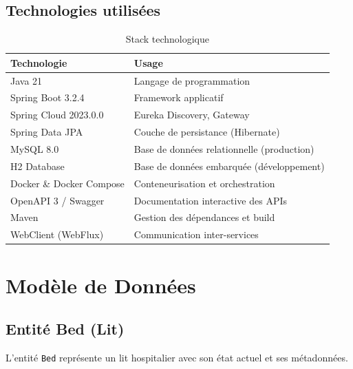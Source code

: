 \documentclass[12pt,a4paper]{report}
\begin{document}
\section{Technologies utilis\'ees}

\begin{table}[H]
    \centering
    \begin{tabularx}{\textwidth}{lX}
        \toprule
        \textbf{Technologie} & \textbf{Usage} \\
        \midrule
        Java 21 & Langage de programmation \\
        Spring Boot 3.2.4 & Framework applicatif \\
        Spring Cloud 2023.0.0 & Eureka Discovery, Gateway \\
        Spring Data JPA & Couche de persistance (Hibernate) \\
        MySQL 8.0 & Base de donn\'ees relationnelle (production) \\
        H2 Database & Base de donn\'ees embarqu\'ee (d\'eveloppement) \\
        Docker \& Docker Compose & Conteneurisation et orchestration \\
        OpenAPI 3 / Swagger & Documentation interactive des APIs \\
        Maven & Gestion des d\'ependances et build \\
        WebClient (WebFlux) & Communication inter-services \\
        \bottomrule
    \end{tabularx}
    \caption{Stack technologique}
\end{table}

\chapter{Mod\`ele de Donn\'ees}

\section{Entit\'e Bed (Lit)}

L'entit\'e \texttt{Bed} repr\'esente un lit hospitalier avec son \'etat actuel et ses m\'etadonn\'ees.
\end{document}
